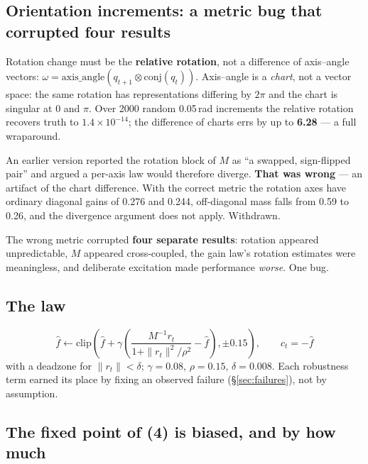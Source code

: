 \documentclass[11pt,a4paper]{article}
\newcommand{\fhat}{\hat{f}}
\begin{document}
\subsection{Orientation increments: a metric bug that corrupted four results}
\label{sec:so3}

Rotation change must be the \textbf{relative rotation}, not a difference of
axis--angle vectors:
$\omega = \mathrm{axis\_angle}(q_{t+1} \otimes \mathrm{conj}(q_t))$.
Axis--angle is a \emph{chart}, not a vector space: the same rotation has
representations differing by $2\pi$ and the chart is singular at $0$ and $\pi$.
Over 2000 random 0.05\,rad increments the relative rotation recovers truth to
$1.4\times 10^{-14}$; the difference of charts errs by up to \textbf{6.28} --- a
full wraparound.

\begin{tcolorbox}[colback=red!3,colframe=red!45!black,title=\textbf{Retraction (2026-08-27)}]
An earlier version reported the rotation block of $M$ as ``a swapped,
sign-flipped pair'' and argued a per-axis law would therefore diverge.
\textbf{That was wrong} --- an artifact of the chart difference. With the correct
metric the rotation axes have ordinary diagonal gains of 0.276 and 0.244,
off-diagonal mass falls from 0.59 to 0.26, and the divergence argument does not
apply. Withdrawn.
\end{tcolorbox}

The wrong metric corrupted \textbf{four separate results}: rotation appeared
unpredictable, $M$ appeared cross-coupled, the gain law's rotation estimates were
meaningless, and deliberate excitation made performance \emph{worse}. One bug.

\subsection{The law}

\begin{equation}
\fhat \leftarrow \mathrm{clip}\!\left(
  \fhat + \gamma\!\left( \frac{M^{-1} r_t}{1 + \|r_t\|^2/\rho^2} - \fhat \right),
  \pm 0.15 \right), \qquad c_t = -\fhat
\end{equation}
with a deadzone for $\|r_t\| < \delta$; $\gamma = 0.08$, $\rho = 0.15$,
$\delta = 0.008$. Each robustness term earned its place by fixing an observed
failure (\S\ref{sec:failures}), not by assumption.

\subsection{The fixed point of (4) is biased, and by how much}
\label{sec:bias}
\end{document}
